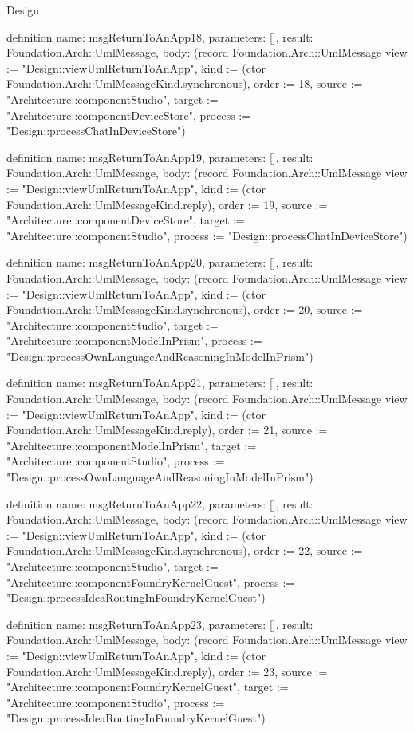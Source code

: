 \begin{lexlean}{Design}
\begin{semanticmodule}
definition{
  name: msgReturnToAnApp18,
  parameters: [],
  result: Foundation.Arch::UmlMessage,
  body: (record Foundation.Arch::UmlMessage {view := "Design::viewUmlReturnToAnApp", kind := (ctor Foundation.Arch::UmlMessageKind.synchronous), order := 18, source := "Architecture::componentStudio", target := "Architecture::componentDeviceStore", process := "Design::processChatInDeviceStore"})
}

definition{
  name: msgReturnToAnApp19,
  parameters: [],
  result: Foundation.Arch::UmlMessage,
  body: (record Foundation.Arch::UmlMessage {view := "Design::viewUmlReturnToAnApp", kind := (ctor Foundation.Arch::UmlMessageKind.reply), order := 19, source := "Architecture::componentDeviceStore", target := "Architecture::componentStudio", process := "Design::processChatInDeviceStore"})
}

definition{
  name: msgReturnToAnApp20,
  parameters: [],
  result: Foundation.Arch::UmlMessage,
  body: (record Foundation.Arch::UmlMessage {view := "Design::viewUmlReturnToAnApp", kind := (ctor Foundation.Arch::UmlMessageKind.synchronous), order := 20, source := "Architecture::componentStudio", target := "Architecture::componentModelInPrism", process := "Design::processOwnLanguageAndReasoningInModelInPrism"})
}

definition{
  name: msgReturnToAnApp21,
  parameters: [],
  result: Foundation.Arch::UmlMessage,
  body: (record Foundation.Arch::UmlMessage {view := "Design::viewUmlReturnToAnApp", kind := (ctor Foundation.Arch::UmlMessageKind.reply), order := 21, source := "Architecture::componentModelInPrism", target := "Architecture::componentStudio", process := "Design::processOwnLanguageAndReasoningInModelInPrism"})
}

definition{
  name: msgReturnToAnApp22,
  parameters: [],
  result: Foundation.Arch::UmlMessage,
  body: (record Foundation.Arch::UmlMessage {view := "Design::viewUmlReturnToAnApp", kind := (ctor Foundation.Arch::UmlMessageKind.synchronous), order := 22, source := "Architecture::componentStudio", target := "Architecture::componentFoundryKernelGuest", process := "Design::processIdeaRoutingInFoundryKernelGuest"})
}

definition{
  name: msgReturnToAnApp23,
  parameters: [],
  result: Foundation.Arch::UmlMessage,
  body: (record Foundation.Arch::UmlMessage {view := "Design::viewUmlReturnToAnApp", kind := (ctor Foundation.Arch::UmlMessageKind.reply), order := 23, source := "Architecture::componentFoundryKernelGuest", target := "Architecture::componentStudio", process := "Design::processIdeaRoutingInFoundryKernelGuest"})
}


\end{semanticmodule}
\end{lexlean}
